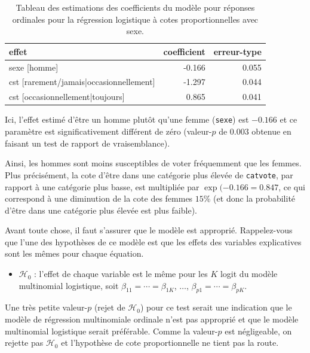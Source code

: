 \documentclass[
  11pt,
  letterpaper,
]{scrbook}
\providecommand{\tightlist}{%
  \setlength{\itemsep}{0pt}\setlength{\parskip}{0pt}}\usepackage{longtable,booktabs,array}
\theoremstyle{definition}
\theoremstyle{remark}
\begin{document}
\hypertarget{tbl-ordered-logistic}{}
\begin{table}
\caption{\label{tbl-ordered-logistic}Tableau des estimations des coefficients du modèle pour réponses
ordinales pour la régression logistique à cotes proportionnelles avec
sexe. }\tabularnewline

\centering
\begin{tabular}[t]{lrr}
\toprule
effet & coefficient & erreur-type\\
\midrule
sexe [homme] & -0.166 & 0.055\\
cst [rarement/jamais|occasionnellement] & -1.297 & 0.044\\
cst [occasionnellement|toujours] & 0.865 & 0.041\\
\bottomrule
\end{tabular}
\end{table}

Ici, l'effet estimé d'être un homme plutôt qu'une femme (\texttt{sexe})
est \(-0.166\) et ce paramètre est significativement différent de zéro
(valeur-\(p\) de \(0.003\) obtenue en faisant un test de rapport de
vraisemblance).

Ainsi, les hommes sont moins susceptibles de voter fréquemment que les
femmes. Plus précisément, la cote d'être dans une catégorie plus élevée
de \texttt{catvote}, par rapport à une catégorie plus basse, est
multipliée par \(\exp(-0.166 = 0.847\), ce qui correspond à une
diminution de la cote des femmes \(15\)\% (et donc la probabilité d'être
dans une catégorie plus élevée est plus faible).

Avant toute chose, il faut s'assurer que le modèle est approprié.
Rappelez-vous que l'une des hypothèses de ce modèle est que les effets
des variables explicatives sont les mêmes pour chaque équation.

\begin{itemize}
\tightlist
\item
  \(\mathscr{H}_0\) : l'effet de chaque variable est le même pour les
  \(K\) logit du modèle multinomial logistique, soit
  \(\beta_{11} = \cdots =\beta_{1K}\), \(\ldots\),
  \(\beta_{p1} = \cdots =\beta_{pK}\).
\end{itemize}

Une très petite valeur-\(p\) (rejet de \(\mathscr{H}_0\)) pour ce test
serait une indication que le modèle de régression multinomiale ordinale
n'est pas approprié et que le modèle multinomial logistique serait
préférable. Comme la valeur-\(p\) est négligeable, on rejette pas
\(\mathscr{H}_0\) et l'hypothèse de cote proportionnelle ne tient pas la
route.
\end{document}
